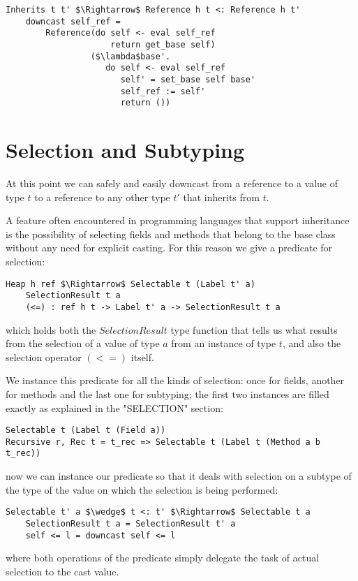 \documentclass[a4paper]{article}
\begin{document}
\begin{lstlisting}
Inherits t t' $\Rightarrow$ Reference h t <: Reference h t'
    downcast self_ref =
        Reference(do self <- eval self_ref
                     return get_base self)
                 ($\lambda$base'.
                    do self <- eval self_ref
                       self' = set_base self base'
                       self_ref := self'
                       return ())
\end{lstlisting}


\section{Selection and Subtyping}

At this point we can safely and easily downcast from a reference to a value of type $t$ to a reference to any other 
type $t'$ that inherits from $t$.

A feature often encountered in programming languages that support inheritance is the possibility of selecting 
fields and methods that belong to the base class without any need for explicit casting. For this reason we 
give a predicate for selection:

\begin{lstlisting}
Heap h ref $\Rightarrow$ Selectable t (Label t' a)
    SelectionResult t a
    (<=) : ref h t -> Label t' a -> SelectionResult t a
\end{lstlisting}

which holds both the $SelectionResult$ type function that tells us what results from the selection of a value of
type $a$ from an instance of type $t$, and also the selection operator $(<=)$ itself.

We instance this predicate for all the kinds of selection: once for fields, another for methods and the last one 
for subtyping; the first two instances are filled exactly as explained in the "SELECTION" section:

\begin{lstlisting}
Selectable t (Label t (Field a))
Recursive r, Rec t = t_rec => Selectable t (Label t (Method a b t_rec))
\end{lstlisting}

now we can instance our predicate so that it deals with selection on a subtype of the type of the value on which 
the selection is being performed:

\begin{lstlisting}
Selectable t' a $\wedge$ t <: t' $\Rightarrow$ Selectable t a
    SelectionResult t a = SelectionResult t' a
    self <= l = downcast self <= l
\end{lstlisting}

where both operations of the predicate simply delegate the task of actual selection to the cast value.
\end{document}
